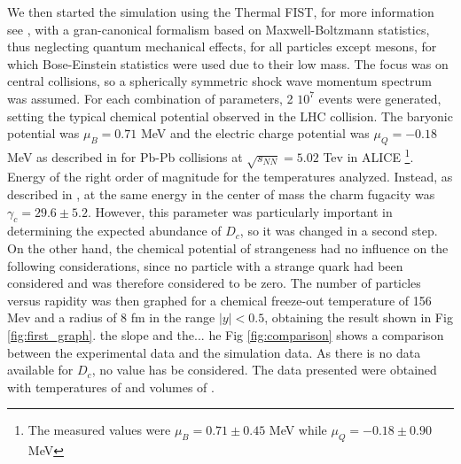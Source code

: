 \documentclass[12pt,a4paper]{book}
\begin{document}
	We then started the simulation using the Thermal FIST, for more information see \cite{Vovchenko_2019}, with a gran-canonical formalism based on Maxwell-Boltzmann statistics, thus neglecting quantum mechanical effects, for all particles except mesons, for which Bose-Einstein statistics were used due to their low mass. The focus was on central collisions, so a spherically symmetric shock wave momentum spectrum was assumed. For each combination of parameters, 2 $10^7$ events were generated, setting the typical chemical potential observed in the LHC collision. The baryonic potential was $\mu_B=0.71$ MeV and the electric charge potential was $\mu_Q= -0.18$ MeV as described in \cite{Acharya_2024} for Pb-Pb collisions at $\sqrt{s_{NN}}= 5.02$ Tev in ALICE \footnote{The measured values were $\mu_B=0.71 \pm 0.45$ MeV while $\mu_Q=-0.18 \pm 0.90$ MeV}. Energy of the right order of magnitude for the temperatures analyzed. Instead, as described in \cite{charm_hierarchy_in_the_statistical_hadronization_model}, at the same energy in the center of mass the charm fugacity was $\gamma_c = 29.6 \pm 5.2$. However, this parameter was particularly important in determining the expected abundance of $D_c$, so it was changed in a second step. On the other hand, the chemical potential of strangeness had no influence on the following considerations, since no particle with a strange quark had been considered and was therefore considered to be zero.
	The number of particles versus rapidity was then graphed for a chemical freeze-out temperature of 156 Mev and a radius of 8 fm in the range $|y| <0.5$, obtaining the result shown in Fig \ref{fig:first_graph}. the slope and the... he Fig \ref{fig:comparison} shows a comparison between the experimental data and the simulation data. As there is no data available for $D_c$, no value has be considered. The data presented were obtained with temperatures of and volumes of .
\end{document}

